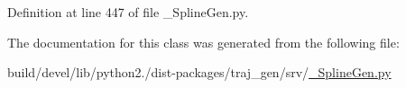 Definition at line 447 of file \+\_\+\+Spline\+Gen.\+py.



The documentation for this class was generated from the following file\+:\begin{DoxyCompactItemize}
\item 
build/devel/lib/python2./dist-\/packages/traj\+\_\+gen/srv/\hyperlink{___spline_gen_8py}{\+\_\+\+Spline\+Gen.\+py}\end{DoxyCompactItemize}
